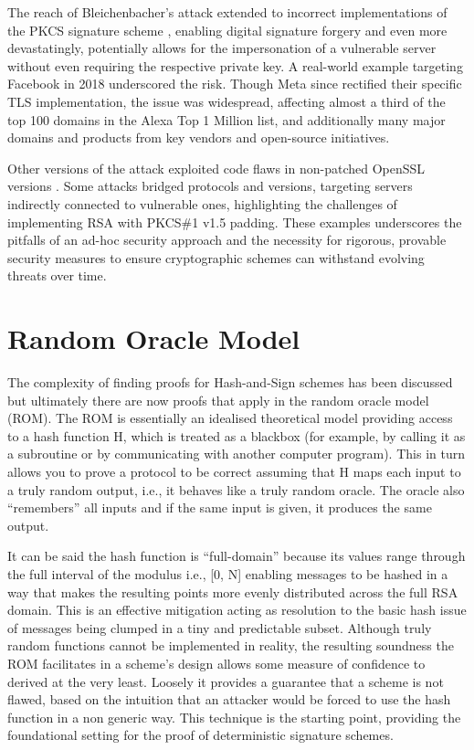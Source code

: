 \documentclass[]{final_report}
\theoremstyle{definition}
\begin{document}
The reach of Bleichenbacher's attack extended to incorrect implementations of the PKCS signature scheme \cite{finney2006bleichenbacher, kuhn2008variants}, enabling digital signature forgery and even more devastatingly, potentially allows for the impersonation of a vulnerable server without even requiring the respective private key. A real-world example targeting Facebook  \cite{bock2018return} in 2018 underscored the risk. Though Meta since rectified their specific TLS implementation, the issue was widespread, affecting almost a third of the top 100 domains in the Alexa Top 1 Million list, and additionally many major domains and products from key vendors and open-source initiatives.

Other versions of the attack exploited code flaws in non-patched OpenSSL versions \cite{CVE-2006-4339}. Some attacks bridged protocols and versions, targeting servers indirectly connected to vulnerable ones, highlighting the challenges of implementing RSA with PKCS\#1 v1.5 padding. These examples underscores the pitfalls of an ad-hoc security approach and the necessity for rigorous, provable security measures to ensure cryptographic schemes can withstand evolving threats over time.


\section{Random Oracle Model}
\label{subSec:ROM}
The complexity of finding proofs for Hash-and-Sign schemes has been discussed but ultimately there are now proofs that apply in the random oracle model (ROM). The ROM \cite{10.1145/168588.168596} is essentially an idealised theoretical model providing access to a hash function H, which is treated as a blackbox (for example, by calling it as a subroutine or by communicating with another computer program). This in turn allows you to prove a protocol to be correct assuming that H maps each input to a truly random output, i.e., it behaves like a truly random oracle. 
The oracle also “remembers” all inputs and if the same input is given, it produces the same output. 

It can be said the hash function is “full-domain” because its values range through the full interval of the modulus i.e., [0, N] enabling messages to be hashed in a way that makes the resulting points more evenly distributed across the full RSA domain. This is an effective mitigation acting as resolution to the basic hash issue of messages being clumped in a tiny and predictable subset. 
Although truly random functions cannot be implemented in reality, the resulting soundness the ROM facilitates in a scheme’s design allows some measure of confidence to derived at the very least. Loosely it provides a guarantee that a scheme is not flawed, based on the intuition that an attacker would be forced to use the hash function in a non generic way. This technique is the starting point, providing the foundational setting for the proof of deterministic signature schemes.
\end{document}
